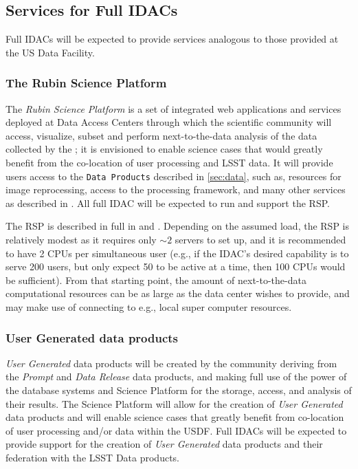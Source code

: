 \subsection{Services for Full IDACs}

Full IDACs will be expected to provide services analogous to those provided at the \gls{US} Data Facility.

\subsubsection{The Rubin \gls{Science Platform}}

The {\it Rubin \gls{Science Platform}}  is a set of integrated web applications and services deployed at  \RO Data Access Centers through which the scientific community will access, visualize, subset and perform next-to-the-data analysis of the data collected by the \RO; it is envisioned to enable science cases that would greatly benefit from the co-location of user processing and \gls{LSST} data. It will provide users access to the {\tt Data Products} described in \ref{sec:data}, such as, resources for image reprocessing, access to the \RO processing framework, and many other services as described in .  All full \gls{IDAC} will be expected to run and support the \gls{RSP}.

The \gls{RSP} is described in full in  and . Depending on the assumed load, the \gls{RSP} is relatively modest as it requires only $\sim2$ servers to set up, and it is recommended to have 2 CPUs per simultaneous user (e.g., if the \gls{IDAC}'s desired capability is to serve 200 users, but only expect 50 to be active at a time, then 100 CPUs would be sufficient). From that starting point, the amount of next-to-the-data computational resources can be as large as the data center wishes to provide, and may make use of connecting to e.g., local super computer resources.
\subsubsection{User Generated data products }

{\it User Generated} data products will be created by the community deriving from the {\it Prompt} and {\it \gls{Data Release}} data products, and making  full use of the power of the \RO database systems and
Science Platform for the storage, access, and analysis of their results.
The \gls{Science Platform} will allow for the creation of {\it User Generated} data products and will enable science cases that greatly benefit from co-location of user processing and/or data within the USDF. Full IDACs will be expected to provide support for the creation of {\it User Generated} data products and their federation with the \gls{LSST} Data products.

